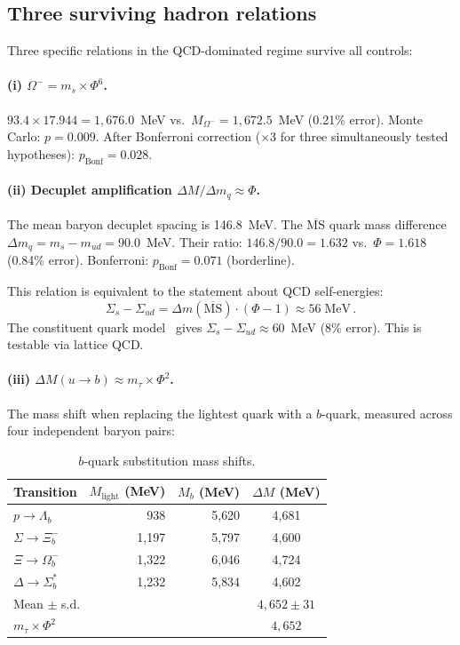 \documentclass[11pt,a4paper]{article}
\begin{document}
\subsection{Three surviving hadron relations}
\label{sec:hadrontraces}

Three specific relations in the QCD-dominated regime survive all
controls:

\paragraph{(i) $\Omega^- = m_s \times \Phi^6$.}
$93.4 \times 17.944 = 1{,}676.0$~MeV vs.\ $M_{\Omega^-} =
1{,}672.5$~MeV (0.21\% error). Monte Carlo: $p = 0.009$.
After Bonferroni correction ($\times 3$ for three simultaneously
tested hypotheses): $p_\text{Bonf} = 0.028$.

\paragraph{(ii) Decuplet amplification $\Delta M / \Delta m_q
\approx \Phi$.}
The mean baryon decuplet spacing is 146.8~MeV. The
$\overline{\text{MS}}$ quark mass difference
$\Delta m_q = m_s - m_{ud} = 90.0$~MeV. Their ratio:
$146.8 / 90.0 = 1.632$ vs.\ $\Phi = 1.618$ (0.84\% error).
Bonferroni: $p_\text{Bonf} = 0.071$ (borderline).

This relation is equivalent to the statement about QCD self-energies:
\begin{equation}
  \Sigma_s - \Sigma_{ud}
  = \Delta m(\overline{\text{MS}}) \cdot (\Phi - 1)
  \approx 56\;\text{MeV}\,.
  \label{eq:chiral}
\end{equation}
The constituent quark model~\cite{DeRujula1975} gives
$\Sigma_s - \Sigma_{ud} \approx 60$~MeV (8\% error). This is
testable via lattice QCD.

\paragraph{(iii) $\Delta M(u \to b) \approx m_\tau \times \Phi^2$.}
The mass shift when replacing the lightest quark with a $b$-quark,
measured across four independent baryon pairs:

\begin{table}[H]
\centering
\caption{$b$-quark substitution mass shifts.}
\label{tab:bsubst}
\begin{tabular}{@{}lrrc@{}}
\toprule
Transition & $M_\text{light}$ (MeV) & $M_b$ (MeV) & $\Delta M$ (MeV) \\
\midrule
$p \to \Lambda_b$       & 938   & 5{,}620 & 4{,}681 \\
$\Sigma \to \Xi_b^-$    & 1{,}197 & 5{,}797 & 4{,}600 \\
$\Xi \to \Omega_b^-$    & 1{,}322 & 6{,}046 & 4{,}724 \\
$\Delta \to \Sigma_b^*$ & 1{,}232 & 5{,}834 & 4{,}602 \\
\midrule
\multicolumn{3}{l}{Mean $\pm$ s.d.} & $4{,}652 \pm 31$ \\
\multicolumn{3}{l}{$m_\tau \times \Phi^2$} & $4{,}652$ \\
\bottomrule
\end{tabular}
\end{table}
\end{document}
